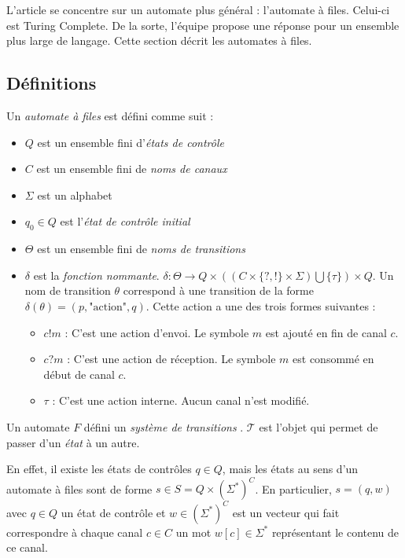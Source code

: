 L'article \cite{Vardhan04} se concentre sur un automate plus général : l'automate à files. Celui-ci est Turing Complete. De la sorte, l'équipe propose une réponse pour un ensemble plus large de langage. Cette section décrit les automates à files.




\subsection{Définitions}\label{ss:fifodef}

\begin{definition}
  Un \emph{automate à files} \fifo est défini comme suit :
  \begin{itemize}
    \item $Q$ est un ensemble fini d'\emph{états de contrôle}
    \item $C$ est un ensemble fini de \emph{noms de canaux}
    \item $\Sigma$ est un alphabet
    \item $q_0 \in Q$ est l'\emph{état de contrôle initial}
    \item $\Theta$ est un ensemble fini de \emph{noms de transitions}
    \item $\delta$ est la \emph{fonction nommante}. $\delta : \Theta \rightarrow Q \times ((C \times \{?,!\} \times \Sigma) \bigcup \{\tau\}) \times Q$. Un nom de transition $\theta$ correspond à une transition de la forme $\delta(\theta)=(p,\text{"action"},q)$. Cette action a une des trois formes suivantes :
    \begin{itemize}
      \item $c!m$ : C'est une action d'envoi. Le symbole $m$ est ajouté en fin de canal $c$.
      \item $c?m$ : C'est une action de réception. Le symbole $m$ est consommé en début de canal $c$.
      \item $\tau$ : C'est une action interne. Aucun canal n'est modifié.
    \end{itemize}
  \end{itemize}
\end{definition}

Un automate $F$ défini un \emph{système de transitions} \tsys. $\mathcal{T}$ est l'objet qui permet de passer d'un \emph{état} à un autre.

En effet, il existe les états de contrôles $q\in Q$, mais les états au sens d'un automate à files sont de forme $s \in S=Q\times(\Sigma^*)^C$. En particulier, $s=(q,w)$ avec $q\in Q$ un état de contrôle et $w\in (\Sigma^*)^C$ est un vecteur qui fait correspondre à chaque canal $c\in C$ un mot $w[c] \in \Sigma^*$ représentant le contenu de ce canal.

